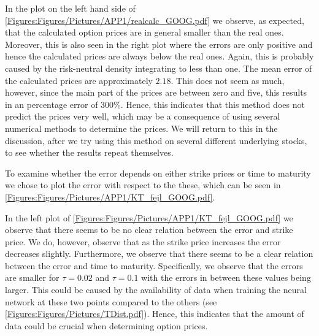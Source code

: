 In the plot on the left hand side of \autoref{Figures:Figures/Pictures/APP1/realcalc_GOOG.pdf} we observe, as expected, that the calculated option prices are in general smaller than the real ones. Moreover, this is also seen in the right plot where the errors are only positive and hence the calculated prices are always below the real ones. Again, this is probably caused by the risk-neutral density integrating to less than one. The mean error of the calculated prices are approximately $2.18$. This does not seem as much, however, since the main part of the prices are between zero and five, this results in an percentage error of $300\%$. Hence, this indicates that this method does not predict the prices very well, which may be a consequence of using several numerical methods to determine the prices. We will return to this in the discussion, after we try using this method on several different underlying stocks, to see whether the results repeat themselves. 

To examine whether the error depends on either strike prices or time to maturity we chose to plot the error with respect to the these, which can be seen in \autoref{Figures:Figures/Pictures/APP1/KT_fejl_GOOG.pdf}. 


In the left plot of \autoref{Figures:Figures/Pictures/APP1/KT_fejl_GOOG.pdf} we observe that there seems to be no clear relation between the error and strike price. We do, however, observe that as the strike price increases the error decreases slightly. Furthermore, we observe that there seems to be a clear relation between the error and time to maturity. Specifically, we observe that the errors are smaller for $\tau=0.02$ and $\tau=0.1$ with the errors in between these values being larger. This could be caused by the availability of data when training the neural network at these two points compared to the others (see \autoref{Figures:Figures/Pictures/TDist.pdf}). Hence, this indicates that the amount of data could be crucial when determining option prices.

